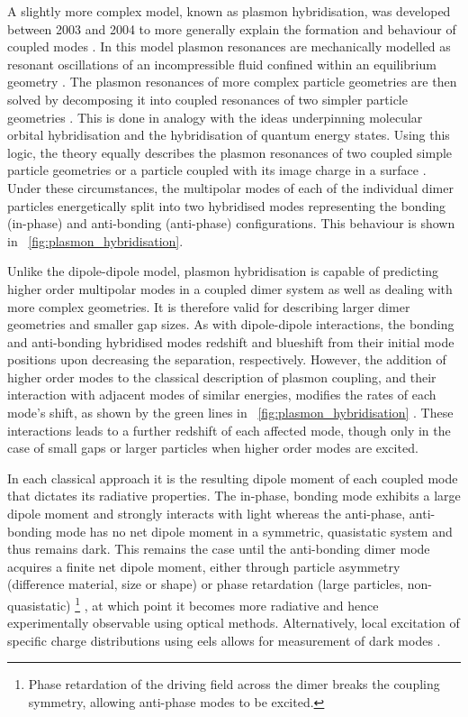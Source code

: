 \documentclass{article}
\begin{document}
A slightly more complex model, known as plasmon hybridisation, was developed between 2003 and 2004 to more generally explain the formation and behaviour of coupled modes \cite{prodan2003, prodan2004, nordlander2004}. In this model plasmon resonances are mechanically modelled as resonant oscillations of an incompressible fluid confined within an equilibrium geometry \cite{prodan2004}. The plasmon resonances of more complex particle geometries are then solved by decomposing it into coupled resonances of two simpler particle geometries \cite{prodan2003, prodan2004}. This is done in analogy with the ideas underpinning molecular orbital hybridisation and the hybridisation of quantum energy states. Using this logic, the theory equally describes the plasmon resonances of two coupled simple particle geometries \cite{nordlander2004} or a particle coupled with its image charge in a surface \cite{nordlander2004a}. Under these circumstances, the multipolar modes of each of the individual dimer particles energetically split into two hybridised modes representing the bonding (in-phase) and anti-bonding (anti-phase) configurations. This behaviour is shown in \figurename~\ref{fig:plasmon_hybridisation}.

Unlike the dipole-dipole model, plasmon hybridisation is capable of predicting higher order multipolar modes in a coupled dimer system as well as dealing with more complex geometries. It is therefore valid for describing larger dimer geometries and smaller gap sizes. As with dipole-dipole interactions, the bonding and anti-bonding hybridised modes redshift and blueshift from their initial mode positions upon decreasing the separation, respectively. However, the addition of higher order modes to the classical description of plasmon coupling, and their interaction with adjacent modes of similar energies, modifies the rates of each mode's shift, as shown by the green lines in \figurename~\ref{fig:plasmon_hybridisation} \cite{nordlander2004}. These interactions leads to a further redshift of each affected mode, though only in the case of small gaps or larger particles when higher order modes are excited.

In each classical approach it is the resulting dipole moment of each coupled mode that dictates its radiative properties. The in-phase, bonding mode exhibits a large dipole moment and strongly interacts with light whereas the anti-phase, anti-bonding mode has no net dipole moment in a symmetric, quasistatic system and thus remains dark. This remains the case until the anti-bonding dimer mode acquires a finite net dipole moment, either through particle asymmetry (difference material, size or shape) or phase retardation (large particles, non-quasistatic)%
\footnote{Phase retardation of the driving field across the dimer breaks the coupling symmetry, allowing anti-phase modes to be excited.}%
, at which point it becomes more radiative and hence experimentally observable using optical methods. Alternatively, local excitation of specific charge distributions using \gls{eels} allows for measurement of dark modes \cite{chu2008, koh2009}.
\end{document}
